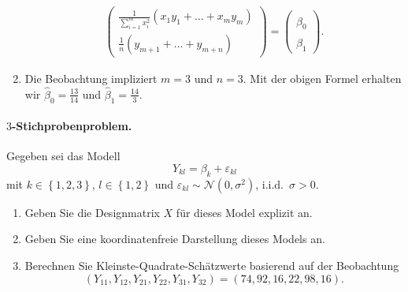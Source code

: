 \begin{enumerate}
\begin{align*}
                \left(
                \begin{array}{c}
                    \frac{1}{\sum_{i=1}^{m} x_i^2} \left( x_1 y_1 + \ldots + x_m y_m \right)  \\
                    \frac{1}{n} \left( y_{m+1}+ \ldots + y_{m+n} \right)
                \end{array}
                \right) = \left(
                \begin{array}{c}
                    \hat\beta_0 \\ \hat\beta_1
                \end{array}
                \right).
            \end{align*}
        \item Die Beobachtung impliziert $m=3$ und $n=3$. Mit der obigen Formel erhalten wir
            $\hat \beta_0 = \frac{13}{14}$ und $\hat \beta_1 = \frac{14}{3}$.
\end{enumerate}






\paragraph{$3$-Stichprobenproblem. } 
Gegeben sei das Modell
\begin{equation*}
    Y_{kl} = \beta_k + \varepsilon_{kl}
\end{equation*}
mit $k\in \left\{ 1,2,3 \right\}$, $l\in \left\{ 1,2 \right\}$ und 
$\varepsilon_{kl}\sim \mathcal N(0,\sigma^2)$, i.i.d.\  $\sigma>0$.
\begin{enumerate}
    \item Geben Sie die Designmatrix $X$ für dieses Model explizit an.
    \item Geben Sie eine koordinatenfreie Darstellung dieses Models an.
    \item Berechnen Sie Kleinste-Quadrate-Schätzwerte basierend auf der Beobachtung
        \begin{equation*}
            \left( Y_{11},Y_{12},Y_{21},Y_{22},Y_{31},Y_{32} \right) = \left(74, 92, 16, 22, 98, 16 \right).
        \end{equation*}
\end{enumerate}


